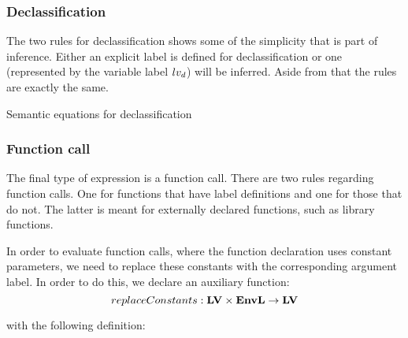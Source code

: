 \subsubsection{Declassification}
The two rules for declassification shows some of the simplicity that is part of inference.
Either an explicit label is defined for declassification or one (represented by the variable label $lv_d$) will be inferred.
Aside from that the rules are exactly the same.

\begin{table}[H]
\begin{semanticequations}
 \seSpace
\end{semanticequations}
\caption{Semantic equations for declassification}
\label{cstr:declassification}
\end{table}

\subsubsection{Function call}
The final type of expression is a function call.
There are two rules regarding function calls.
One for functions that have label definitions and one for those that do not.
The latter is meant for externally declared functions, such as library functions.

In order to evaluate function calls, where the function declaration uses constant parameters, we need to replace these constants with the corresponding argument label.
In order to do this, we declare an auxiliary function:
\[ replaceConstants : \mathbf{LV} \times \mathbf{EnvL} \rightarrow \mathbf{LV} \]

with the following definition:

